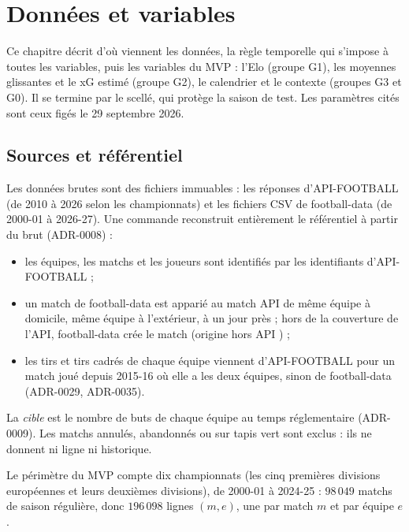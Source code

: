 
\chapter{Données et variables}
\label{chap:donnees}

Ce chapitre décrit d'où viennent les données, la règle temporelle qui s'impose à toutes les
variables, puis les variables du MVP : l'Elo (groupe G1), les moyennes glissantes et le
\og xG estimé \fg{} (groupe G2), le calendrier et le contexte (groupes G3 et G0). Il se termine
par le scellé, qui protège la saison de test. Les paramètres cités sont ceux figés le
29 septembre 2026.

\section{Sources et référentiel}
\label{sec:sources}

Les données brutes sont des fichiers immuables : les réponses d'API-FOOTBALL (de 2010 à 2026
selon les championnats) et les fichiers CSV de football-data (de 2000-01 à 2026-27). Une
commande reconstruit entièrement le référentiel  à partir du brut (ADR-0008) :
\begin{itemize}
  \item les équipes, les matchs et les joueurs sont identifiés par les identifiants
        d'API-FOOTBALL ;
  \item un match de football-data est apparié au match API de même équipe à domicile, même équipe
        à l'extérieur, à un jour près ; hors de la couverture de l'API, football-data crée le
        match (origine \og hors API \fg{}) ;
  \item les tirs et tirs cadrés de chaque équipe viennent d'API-FOOTBALL pour un match joué depuis
        2015-16 où elle a les deux équipes, sinon de football-data (ADR-0029, ADR-0035).
\end{itemize}
La \emph{cible} est le nombre de buts de chaque équipe au temps réglementaire (ADR-0009). Les matchs
annulés, abandonnés ou sur tapis vert sont exclus : ils ne donnent ni ligne ni historique.

Le périmètre du MVP compte dix championnats (les cinq premières divisions européennes et leurs
deuxièmes divisions), de 2000-01 à 2024-25 : \(98\,049\) matchs de saison régulière, donc
\(196\,098\) lignes \((m, e)\), une par match \(m\) et par équipe \(e\).

